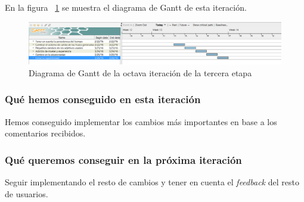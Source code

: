 En la figura ~\ref{fig:sec3it8} se muestra el diagrama de Gantt de esta iteración.

\begin{figure}
    \includegraphics[width=\textwidth,height=\textheight,keepaspectratio]{./img/sec3it8.png}
  \caption{Diagrama de Gantt de la octava iteración de la tercera etapa}
  \label{fig:sec3it8}
\end{figure}

\subsubsection{Qué hemos conseguido en esta iteración}

Hemos conseguido implementar los cambios más importantes en base a los comentarios recibidos.

\subsubsection{Qué queremos conseguir en la próxima iteración}

Seguir implementando el resto de cambios y tener en cuenta el \textit{feedback} del resto de usuarios.